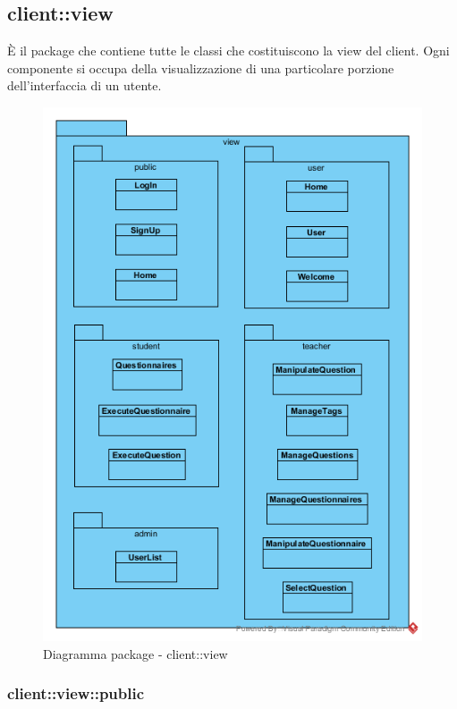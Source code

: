 \subsection{client::view}
È il package che contiene tutte le classi che costituiscono la view del client. 
Ogni componente si occupa della visualizzazione di una particolare porzione dell'interfaccia di un utente.\begin{center}
	\begin{figure}[H]
		\centering \includegraphics[scale=4, max width=\textwidth, max height=\myheight]{../img/diagrammiClassi/client/view.png}
		\caption{Diagramma package - client::view}
	\end{figure}
\end{center}\subsubsection{client::view::public}
